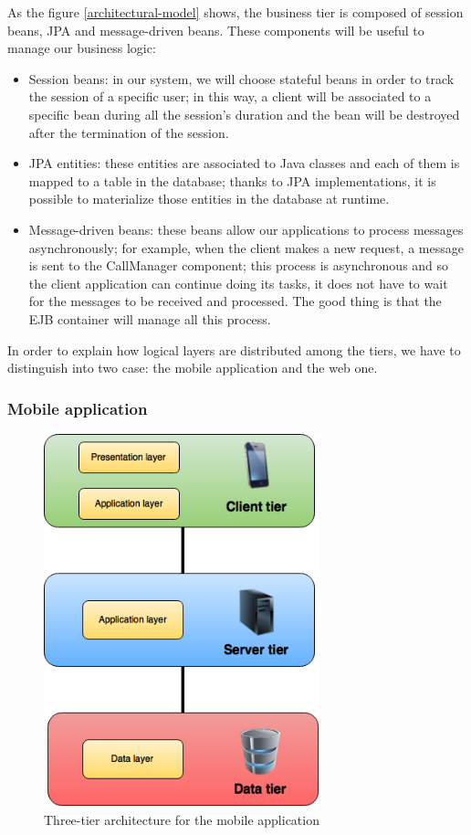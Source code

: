 As the figure \ref{architectural-model} shows, the business tier is composed of session beans, JPA and message-driven beans. These components will be useful to manage our business logic:
    \begin{itemize}
        \item Session beans: in our system, we will choose stateful beans in order to track the session of a specific user; in this way, a client will be associated to a specific bean during all the session's duration and the bean will be destroyed after the termination of the session.
        \item JPA entities: these entities are associated to Java classes and each of them is mapped to a table in the database; thanks to JPA implementations, it is possible to materialize those entities in the database at runtime.
        \item Message-driven beans: these beans allow our applications to process messages asynchronously; for example, when the client makes a new request, a message is sent to the CallManager component; this process is asynchronous and so the client application can continue doing its tasks, it does not have to wait for the messages to be received and processed. The good thing is that the EJB container will manage all this process. 
    \end{itemize}
In order to explain how logical layers are distributed among the tiers, we have to distinguish into two case: the mobile application and the web one.

\subsubsection{Mobile application}

    \begin{figure}[H]
        \centering
        \includegraphics[width=8cm]{./Images/MobileApplication.png}
        \caption{Three-tier architecture for the mobile application}
    \end{figure}


